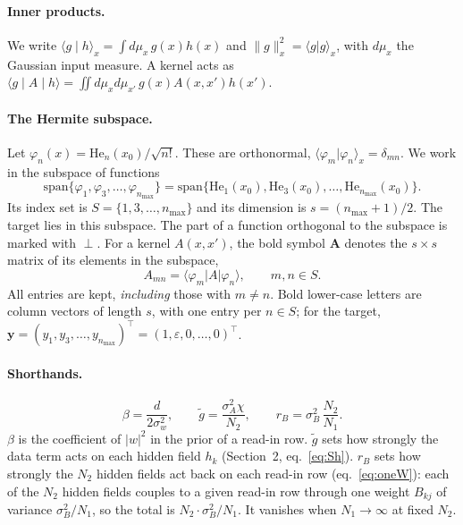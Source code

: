 \documentclass[11pt,a4paper]{article}
\newcommand{\He}{\mathrm{He}}
\begin{document}
\paragraph{Inner products.}
We write $\langle g\mid h\rangle_x=\int d\mu_x\,g(x)h(x)$ and $\|g\|_x^2=\langle g|g\rangle_x$, with $d\mu_x$ the Gaussian input measure.
A kernel acts as $\langle g\mid A\mid h\rangle=\iint d\mu_xd\mu_{x'}\,g(x)A(x,x')h(x')$.

\paragraph{The Hermite subspace.}
Let $\varphi_n(x)=\He_n(x_0)/\sqrt{n!}$.
These are orthonormal, $\langle\varphi_m|\varphi_n\rangle_x=\delta_{mn}$.
We work in the subspace of functions
\begin{equation*}
  \mathrm{span}\{\varphi_1,\varphi_3,\dots,\varphi_{n_{\max}}\}
  =\mathrm{span}\{\He_1(x_0),\He_3(x_0),\dots,\He_{n_{\max}}(x_0)\}.
\end{equation*}
Its index set is $S=\{1,3,\dots,n_{\max}\}$ and its dimension is $s=(n_{\max}+1)/2$.
The target lies in this subspace.
The part of a function orthogonal to the subspace is marked with $\perp$.
For a kernel $A(x,x')$, the bold symbol $\mathbf A$ denotes the $s\times s$ matrix of its elements in the subspace,
\begin{equation*}
  A_{mn}=\langle\varphi_m|A|\varphi_n\rangle,\qquad m,n\in S.
\end{equation*}
All entries are kept, \emph{including} those with $m\neq n$.
Bold lower-case letters are column vectors of length $s$, with one entry per $n\in S$; for the target,
$\mathbf y=(y_1,y_3,\dots,y_{n_{\max}})^\top=(1,\varepsilon,0,\dots,0)^\top$.

\paragraph{Shorthands.}
\begin{equation}
  \beta=\frac{d}{2\sigma_w^2},\qquad \tilde g=\frac{\sigma_A^2\chi}{N_2},\qquad r_B=\sigma_B^2\,\frac{N_2}{N_1}.
\end{equation}
$\beta$ is the coefficient of $|w|^2$ in the prior of a read-in row.
$\tilde g$ sets how strongly the data term acts on each hidden field $h_k$ (Section~2, eq.~\eqref{eq:Sh}).
$r_B$ sets how strongly the $N_2$ hidden fields act back on each read-in row (eq.~\eqref{eq:oneW}):
each of the $N_2$ hidden fields couples to a given read-in row through one weight $B_{kj}$ of variance $\sigma_B^2/N_1$,
so the total is $N_2\cdot\sigma_B^2/N_1$.
It vanishes when $N_1\to\infty$ at fixed $N_2$.
\end{document}

